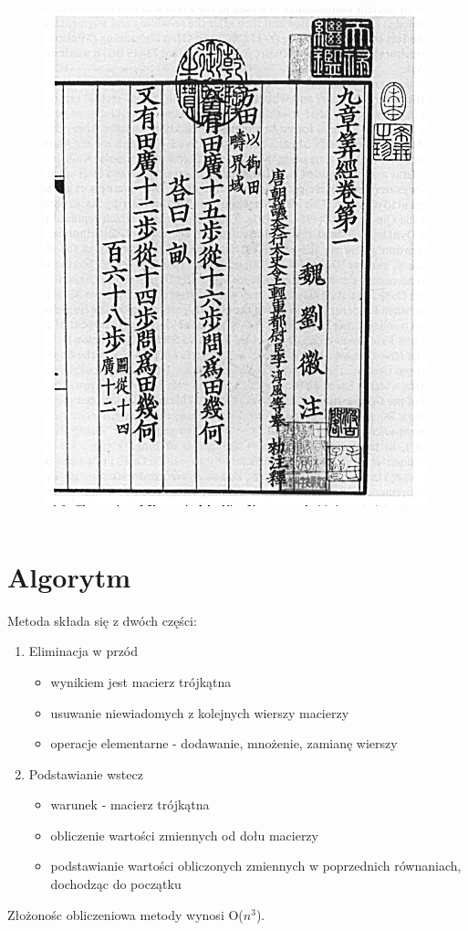 \documentclass{beamer}
\begin{document}
\begin{frame}
\begin{columns}
\begin{figure}
				\includegraphics[scale=0.2]{gfx/tncotma.png}
			\end{figure}
		\end{columns}		
	\end{frame}
	
	\section{Algorytm}
	\begin{frame}
		Metoda składa się z dwóch części:
		\begin{enumerate}
			\item Eliminacja w przód
				\begin{itemize}
					\item wynikiem jest macierz trójkątna
					\item usuwanie niewiadomych z kolejnych wierszy macierzy
					\item operacje elementarne - dodawanie, mnożenie, zamianę wierszy
				\end{itemize}
			\item Podstawianie wstecz
				\begin{itemize}
					\item warunek - macierz trójkątna
					\item obliczenie wartości zmiennych od dołu macierzy
					\item podstawianie wartości obliczonych zmiennych w poprzednich równaniach, dochodząc do początku
				\end{itemize}
		\end{enumerate}
		Złożonośc obliczeniowa metody wynosi O($n^3$).
	\end{frame}
	
\end{document}
